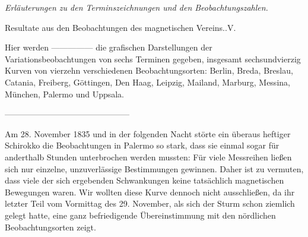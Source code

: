 \begin{center}\large\textit{Erläuterungen zu den Terminszeichnungen und den Beobachtungszahlen.}\par
[\textit{Im Auszug.}]\end{center}
\begin{center}\small Resultate aus den Beobachtungen des magnetischen Vereins..\quad V.\end{center}

Hier werden ---\quad---\quad---\quad---\quad--- die grafischen Darstellungen der Variationsbeobachtungen von sechs Terminen gegeben, insgesamt sechsundvierzig Kurven von vierzehn verschiedenen Beobachtungsorten: Berlin, Breda, Breslau, Catania, Freiberg, Göttingen, Den Haag, Leipzig, Mailand, Marburg, Messina, München, Palermo und Uppsala.
\begin{center}\small
---\enspace---\enspace---\enspace---\enspace---\enspace---\enspace---\enspace---\enspace---\enspace---\enspace---\enspace---\enspace---\enspace---\enspace---
\end{center}
Am 28. November 1835 und in der folgenden Nacht störte ein überaus heftiger Schirokko die Beobachtungen in Palermo so stark, dass sie einmal sogar für anderthalb Stunden unterbrochen werden mussten:
Für viele Messreihen ließen sich nur einzelne, unzuverlässige Bestimmungen gewinnen. Daher ist zu vermuten, dass viele der sich ergebenden Schwankungen keine tatsächlich magnetischen Bewegungen waren. Wir wollten diese Kurve dennoch nicht ausschließen, da ihr letzter Teil vom Vormittag des 29. November, als sich der Sturm schon ziemlich gelegt hatte, eine ganz befriedigende Übereinstimmung mit den nördlichen Beobachtungsorten zeigt.


